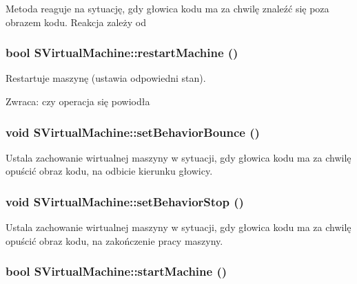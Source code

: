 Metoda reaguje na sytuację, gdy głowica kodu ma za chwilę znaleźć się poza obrazem kodu. Reakcja zależy od \hypertarget{classSVirtualMachine_5be1048d2d6f330994a10032d9609277}{
\subsubsection[{restartMachine}]{\setlength{\rightskip}{0pt plus 5cm}bool SVirtualMachine::restartMachine ()}}
\label{classSVirtualMachine_5be1048d2d6f330994a10032d9609277}


Restartuje maszynę (ustawia odpowiedni stan). \begin{Desc}
\item[Zwraca:]czy operacja się powiodła \end{Desc}
\hypertarget{classSVirtualMachine_0b29c76aa5023f0fe0b1237024ca5103}{
\subsubsection[{setBehaviorBounce}]{\setlength{\rightskip}{0pt plus 5cm}void SVirtualMachine::setBehaviorBounce ()}}
\label{classSVirtualMachine_0b29c76aa5023f0fe0b1237024ca5103}


Ustala zachowanie wirtualnej maszyny w sytuacji, gdy głowica kodu ma za chwilę opuścić obraz kodu, na odbicie kierunku głowicy. \hypertarget{classSVirtualMachine_6d7c9f2fe223810123062d1c74ae542a}{
\subsubsection[{setBehaviorStop}]{\setlength{\rightskip}{0pt plus 5cm}void SVirtualMachine::setBehaviorStop ()}}
\label{classSVirtualMachine_6d7c9f2fe223810123062d1c74ae542a}


Ustala zachowanie wirtualnej maszyny w sytuacji, gdy głowica kodu ma za chwilę opuścić obraz kodu, na zakończenie pracy maszyny. \hypertarget{classSVirtualMachine_49e93dd25b48a8dbba896f9b2964c526}{
\subsubsection[{startMachine}]{\setlength{\rightskip}{0pt plus 5cm}bool SVirtualMachine::startMachine ()}}
\label{classSVirtualMachine_49e93dd25b48a8dbba896f9b2964c526}


